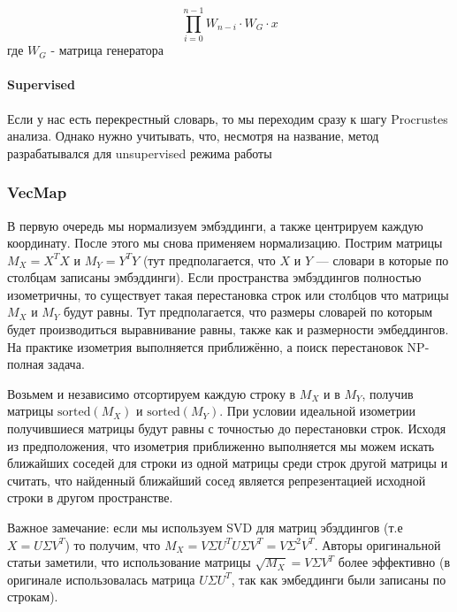 \documentclass{article}
\begin{document}
    \begin{equation}
        \prod_{i = 0}^{n - 1} W_{n - i} \cdot W_{G} \cdot x
    \end{equation}
    где $W_{G}$ - матрица генератора

    \paragraph{Supervised}

    \quad

    Если у нас есть перекрестный словарь, то мы переходим сразу к шагу Procrustes анализа. Однако нужно учитывать, что, несмотря 
    на название, метод разрабатывался для unsupervised режима работы

    \subsubsection{VecMap}

    В первую очередь мы нормализуем эмбэддинги, а также центрируем каждую координату. После этого мы снова применяем 
    нормализацию. Пострим матрицы $M_{X} = X^{T} X$ и $M_{Y} = Y^{T}Y$ (тут предполагается, что $X$ и $Y$ --- словари в которые по столбцам записаны эмбэддинги).
    Если пространства эмбэддингов полностью изометричны, то существует такая перестановка строк или столбцов что матрицы $M_{X}$ и $M_{Y}$ будут равны.
    Тут предполагается, что размеры словарей по которым будет производиться выравнивание равны, также как и размерности эмбеддингов. 
    На практике изометрия выполняется приближённо, а поиск перестановок NP-полная задача. 

    Возьмем и независимо отсортируем каждую строку в $M_{X}$ и в $M_{Y}$, получив матрицы $\text{sorted}(M_{X})$
    и $\text{sorted}(M_{Y})$. 
    При условии идеальной изометрии получившиеся матрицы 
    будут равны с точностью до перестановки строк. Исходя из предположения, что изометрия приближенно выполняется
    мы можем искать ближайших соседей для строки из одной матрицы среди строк другой матрицы и считать, что найденный ближайший сосед 
    является репрезентацией исходной строки в другом пространстве. 

    Важное замечание: если мы используем SVD для матриц эбэддингов (т.е $X = U \Sigma V^{T}$) 
    то получим, что $M_{X} = V \Sigma U^{T}  U \Sigma V^{T} = V \Sigma^{2} V^{T}$. Авторы оригинальной 
    статьи заметили, что использование матрицы $\sqrt{M_{X}} = V \Sigma V^{T}$ более эффективно 
    (в оригинале использовалась матрица $U \Sigma U^{T}$, так как эмбеддинги были записаны по строкам).
\end{document}
